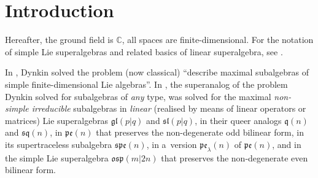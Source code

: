 \documentclass[pdftex]{sigma}
\newcommand {\Cee} {{\mathbb C}}
\newcommand {\fgl} {{\mathfrak{gl}}} %
\newcommand {\fosp} {{\mathfrak{osp}}}
\newcommand {\fpe} {{\mathfrak{pe}}} %
\newcommand {\fq} {{\mathfrak{q}}}
\newcommand {\fsl} {{\mathfrak{sl}}}
\newcommand {\fspe} {{\mathfrak{spe}}}
\newcommand {\fsq} {{\mathfrak{sq}}}
\newcommand {\<} [2] {{\left.\vphantom{#2}\right.^{#1\!}\!{#2}}}
\numberwithin{equation}{section}
\begin{document}

\newcommand{\arXivNumber}{2503.03339}

\renewcommand{\PaperNumber}{047}

\FirstPageHeading










\section{Introduction}
Hereafter, the ground field is $\Cee$, all spaces are finite-dimensional. For the notation of simple Lie superalgebras and related basics of linear superalgebra, see \cite{Lo}.

In \cite{Dy}, Dynkin solved the problem (now classical) ``describe maximal subalgebras of simple finite-dimensional Lie algebras''.
In \cite{ShM}, the superanalog of the problem Dynkin solved for subalgebras of \textit{any} type, was solved for the maximal \textit{non-simple irreducible}  subalgebras in \textit{linear} (realised by means of linear operators or matrices) Lie superalgebras $\fgl(p|q)$ and $\fsl(p|q)$, in their queer analogs $\fq(n)$ and $\fsq(n)$, in $\fpe(n)$ that preserves the non-degenerate odd bilinear form, in its supertraceless subalgebra $\fspe(n)$, in a~version $\fpe_\lambda(n)$ of $\fpe(n)$, and in the simple Lie superalgebra $\fosp(m|2n)$ that preserves the non-degenerate even bilinear form.
\end{document}
